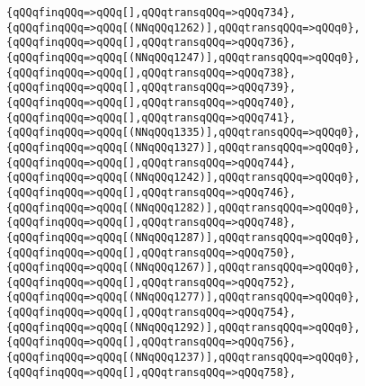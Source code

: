 \verb|{qQQqfinqQQq=>qQQq[],qQQqtransqQQq=>qQQq734},|\newline
\verb|{qQQqfinqQQq=>qQQq[(NNqQQq1262)],qQQqtransqQQq=>qQQq0},|\newline
\verb|{qQQqfinqQQq=>qQQq[],qQQqtransqQQq=>qQQq736},|\newline
\verb|{qQQqfinqQQq=>qQQq[(NNqQQq1247)],qQQqtransqQQq=>qQQq0},|\newline
\verb|{qQQqfinqQQq=>qQQq[],qQQqtransqQQq=>qQQq738},|\newline
\verb|{qQQqfinqQQq=>qQQq[],qQQqtransqQQq=>qQQq739},|\newline
\verb|{qQQqfinqQQq=>qQQq[],qQQqtransqQQq=>qQQq740},|\newline
\verb|{qQQqfinqQQq=>qQQq[],qQQqtransqQQq=>qQQq741},|\newline
\verb|{qQQqfinqQQq=>qQQq[(NNqQQq1335)],qQQqtransqQQq=>qQQq0},|\newline
\verb|{qQQqfinqQQq=>qQQq[(NNqQQq1327)],qQQqtransqQQq=>qQQq0},|\newline
\verb|{qQQqfinqQQq=>qQQq[],qQQqtransqQQq=>qQQq744},|\newline
\verb|{qQQqfinqQQq=>qQQq[(NNqQQq1242)],qQQqtransqQQq=>qQQq0},|\newline
\verb|{qQQqfinqQQq=>qQQq[],qQQqtransqQQq=>qQQq746},|\newline
\verb|{qQQqfinqQQq=>qQQq[(NNqQQq1282)],qQQqtransqQQq=>qQQq0},|\newline
\verb|{qQQqfinqQQq=>qQQq[],qQQqtransqQQq=>qQQq748},|\newline
\verb|{qQQqfinqQQq=>qQQq[(NNqQQq1287)],qQQqtransqQQq=>qQQq0},|\newline
\verb|{qQQqfinqQQq=>qQQq[],qQQqtransqQQq=>qQQq750},|\newline
\verb|{qQQqfinqQQq=>qQQq[(NNqQQq1267)],qQQqtransqQQq=>qQQq0},|\newline
\verb|{qQQqfinqQQq=>qQQq[],qQQqtransqQQq=>qQQq752},|\newline
\verb|{qQQqfinqQQq=>qQQq[(NNqQQq1277)],qQQqtransqQQq=>qQQq0},|\newline
\verb|{qQQqfinqQQq=>qQQq[],qQQqtransqQQq=>qQQq754},|\newline
\verb|{qQQqfinqQQq=>qQQq[(NNqQQq1292)],qQQqtransqQQq=>qQQq0},|\newline
\verb|{qQQqfinqQQq=>qQQq[],qQQqtransqQQq=>qQQq756},|\newline
\verb|{qQQqfinqQQq=>qQQq[(NNqQQq1237)],qQQqtransqQQq=>qQQq0},|\newline
\verb|{qQQqfinqQQq=>qQQq[],qQQqtransqQQq=>qQQq758},|\newline
